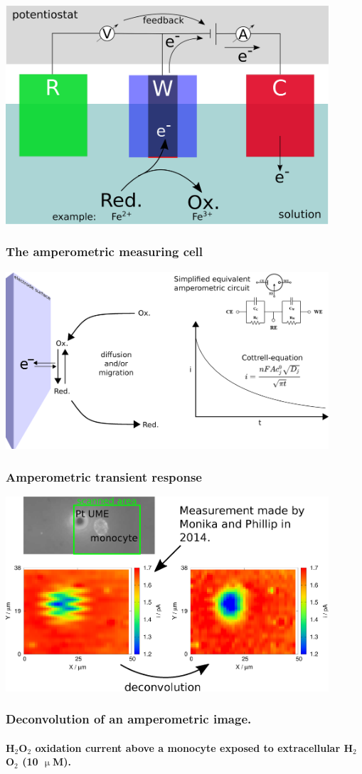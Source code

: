 \documentclass{beamer}
\begin{document}
\begin{frame}
        \centering
        \includegraphics[width=0.9\textwidth]{amperometry.eps}
        \frametitle{The amperometric measuring cell}
\end{frame}

\begin{frame}
        \centering
        \includegraphics[width=0.9\textwidth]{cottrell.eps}
        \frametitle{Amperometric transient response}
\end{frame}

\begin{frame}
        \centering
        \includegraphics[width=0.9\textwidth]{monocyte.eps}
        \frametitle{Deconvolution of an amperometric image.}
        \framesubtitle{H$_2$O$_2$ oxidation current above a monocyte exposed to extracellular H$_2$O$_2$ (10 $\upmu$M).}
\vfill
\end{frame}
\end{document}
